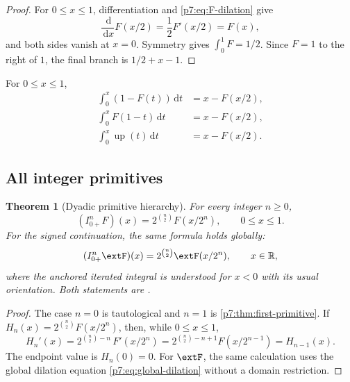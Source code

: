 \documentclass[11pt,oneside]{article}
\newtheorem{theorem}{Theorem}[section]
\theoremstyle{definition}
\theoremstyle{remark}
\newcommand{\Up}{\operatorname{up}}
\newcommand{\R}{\mathbb R}
\newcommand{\dd}{\,\mathrm d}
\newcommand{\1}{\mathbf 1}
\begin{document}
\begin{proof}
For $0\le x\le1$, differentiation and \cref{p7:eq:F-dilation} give
\[
 \frac{\dd}{\dd x}F(x/2)=\frac12F'(x/2)=F(x),
\]
and both sides vanish at $x=0$.  Symmetry gives $\int_0^1F=1/2$.  Since $F=1$ to the
right of $1$, the final branch is $1/2+x-1$.
\end{proof}

\begin{corollary}
For $0\le x\le1$,
\begin{align}
 \int_0^x(1-F(t))\dd t
 &=x-F(x/2),\label{p7:eq:complement-primitive}\\
 \int_0^xF(1-t)\dd t
 &=x-F(x/2),\label{p7:eq:reflected-primitive}\\
 \int_0^x\Up(t)\dd t
 &=x-F(x/2).\label{p7:eq:up-positive-primitive}
\end{align}
\end{corollary}

\subsection{All integer primitives}

\begin{theorem}[Dyadic primitive hierarchy]
\label{p7:thm:integer-primitives}
For every integer $n\ge0$,
\begin{equation}
 (I_{0+}^{n}F)(x)=2^{\binom n2}F(x/2^n),
 \qquad 0\le x\le1.
 \label{p7:eq:F-n-primitive}
\end{equation}
For the signed continuation, the same formula holds globally:
\begin{equation}
 (I_{0+}^{n}\extF)(x)=2^{\binom n2}\extF(x/2^n),
 \qquad x\in\R,
 \label{p7:eq:global-n-primitive}
\end{equation}
where the anchored iterated integral is understood for $x<0$ with its usual orientation.
Both statements are \statusproved.
\end{theorem}

\begin{proof}
The case $n=0$ is tautological and $n=1$ is \cref{p7:thm:first-primitive}.  If
$H_n(x)=2^{\binom n2}F(x/2^n)$, then, while $0\le x\le1$,
\[
 H_n'(x)=2^{\binom n2-n}\,F'(x/2^n)
 =2^{\binom n2-n+1}F(x/2^{n-1})
 =H_{n-1}(x).
\]
The endpoint value is $H_n(0)=0$.  For $\extF$, the same calculation uses the global
dilation equation \cref{p7:eq:global-dilation} without a domain restriction.
\end{proof}
\end{document}
